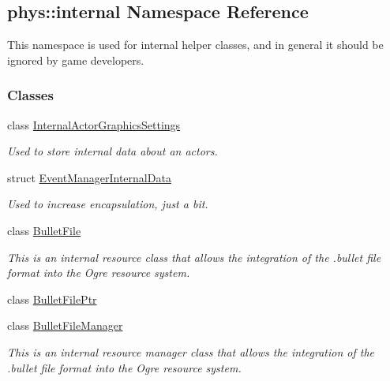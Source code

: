 \hypertarget{namespacephys_1_1internal}{
\subsection{phys::internal Namespace Reference}
\label{d0/d26/namespacephys_1_1internal}
}


This namespace is used for internal helper classes, and in general it should be ignored by game developers.  


\subsubsection*{Classes}
\begin{DoxyCompactItemize}
\item 
class \hyperlink{classphys_1_1internal_1_1InternalActorGraphicsSettings}{InternalActorGraphicsSettings}
\begin{DoxyCompactList}\small\item\em Used to store internal data about an actors. \item\end{DoxyCompactList}\item 
struct \hyperlink{structphys_1_1internal_1_1EventManagerInternalData}{EventManagerInternalData}
\begin{DoxyCompactList}\small\item\em Used to increase encapsulation, just a bit. \item\end{DoxyCompactList}\item 
class \hyperlink{classphys_1_1internal_1_1BulletFile}{BulletFile}
\begin{DoxyCompactList}\small\item\em This is an internal resource class that allows the integration of the .bullet file format into the Ogre resource system. \item\end{DoxyCompactList}\item 
class \hyperlink{classphys_1_1internal_1_1BulletFilePtr}{BulletFilePtr}
\item 
class \hyperlink{classphys_1_1internal_1_1BulletFileManager}{BulletFileManager}
\begin{DoxyCompactList}\small\item\em This is an internal resource manager class that allows the integration of the .bullet file format into the Ogre resource system. \item\end{DoxyCompactList}\item 

\end{DoxyCompactItemize}
